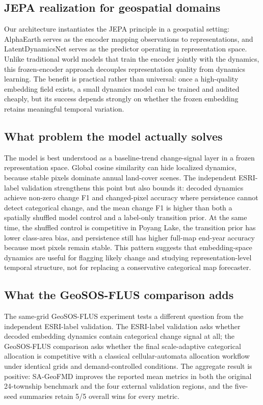\documentclass{article}
\begin{document}
\subsection{JEPA realization for geospatial domains}

Our architecture instantiates the JEPA principle in a geospatial setting: AlphaEarth serves as the encoder mapping observations to representations, and LatentDynamicsNet serves as the predictor operating in representation space. Unlike traditional world models that train the encoder jointly with the dynamics, this frozen-encoder approach decouples representation quality from dynamics learning. The benefit is practical rather than universal: once a high-quality embedding field exists, a small dynamics model can be trained and audited cheaply, but its success depends strongly on whether the frozen embedding retains meaningful temporal variation.

\subsection{What problem the model actually solves}

The model is best understood as a baseline-trend change-signal layer in a frozen representation space. Global cosine similarity can hide localized dynamics, because stable pixels dominate annual land-cover scenes. The independent ESRI-label validation strengthens this point but also bounds it: decoded dynamics achieve non-zero change F1 and changed-pixel accuracy where persistence cannot detect categorical change, and the mean change F1 is higher than both a spatially shuffled model control and a label-only transition prior. At the same time, the shuffled control is competitive in Poyang Lake, the transition prior has lower class-area bias, and persistence still has higher full-map end-year accuracy because most pixels remain stable. This pattern suggests that embedding-space dynamics are useful for flagging likely change and studying representation-level temporal structure, not for replacing a conservative categorical map forecaster.

\subsection{What the GeoSOS-FLUS comparison adds}

The same-grid GeoSOS-FLUS experiment tests a different question from the independent ESRI-label validation. The ESRI-label validation asks whether decoded embedding dynamics contain categorical change signal at all; the GeoSOS-FLUS comparison asks whether the final scale-adaptive categorical allocation is competitive with a classical cellular-automata allocation workflow under identical grids and demand-controlled conditions. The aggregate result is positive: SA-GeoFMD improves the reported mean metrics in both the original 24-township benchmark and the four external validation regions, and the five-seed summaries retain 5/5 overall wins for every metric.
\end{document}
